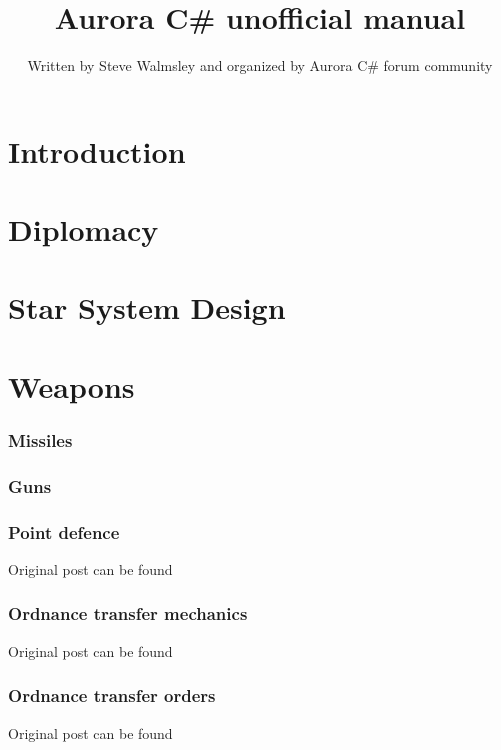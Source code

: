 \documentclass[10pt,a4paper,oneside]{article}
\author{Written by Steve Walmsley and organized by Aurora C\# forum community}
\title{Aurora C\# unofficial manual}
\begin{document}
\maketitle
\newpage
\tableofcontents

\newpage
\part{Introduction}


\newpage
\part{Diplomacy}



\newpage
\part{Star System Design}


\newpage
\part{Weapons}

\section{Missiles}


\section{Guns}


\section{Point defence}
Original post can be found

\section{Ordnance transfer mechanics}
Original post can be found

\section{Ordnance transfer orders}
Original post can be found
\end{document}
